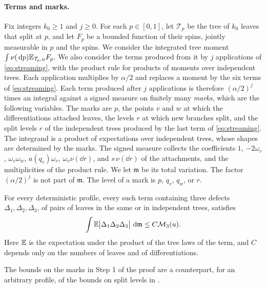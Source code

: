 \paragraph{Terms and marks.}
Fix integers $k_0\ge1$ and $j\ge0$. For each $p\in[0,1]$, let
$\mathcal T_p$ be the tree of $k_0$ leaves that split at $p$, and let
$F_p$ be a bounded function of their spins, jointly measurable in $p$ and
the spins. We consider the integrated tree moment
$\int\nu(\,\mathrm d p)\mathbb E_{\mathcal T_p,u}F_p$. We also consider the terms
produced from it by $j$ applications of \eqref{eq:streaming}, with the
product rule for products of moments over independent trees. Each
application multiplies by $\alpha/2$ and replaces a moment by the six
terms of \eqref{eq:streaming}. Each term produced after $j$ applications
is therefore $(\alpha/2)^j$ times an integral against a signed measure on
finitely many \emph{marks}, which are the following variables. The marks
are $p$, the points $v$ and $w$ at which the differentiations attached
leaves, the levels $r$ at which new branches split, and the split levels
$r$ of the independent trees produced by the last term of
\eqref{eq:streaming}. The integrand is a product of expectations over
independent trees, whose shapes are determined by the marks. The signed
measure collects the coefficients $1$, $-2\omega_v$, $\omega_v\omega_w$,
$a(q_v)\omega_v$, $\omega_v\nu(\dd r)$, and $s\,\nu(\dd r)$ of the
attachments, and the multiplicities of the product rule. We let
$\mathfrak m$ be its total variation. The factor $(\alpha/2)^j$ is not
part of $\mathfrak m$. The level of a mark is $p$, $q_v$, $q_w$, or $r$.

\begin{lemma}\label{lem:cav-threeproducts}
For every deterministic profile, every such term containing three
defects $\Delta_1,\Delta_2,\Delta_3$, of pairs of leaves in the same or
in independent trees, satisfies
\begin{equation}\label{eq:threeproducts}
 \int\mathbb E\bigl|\Delta_1\Delta_2\Delta_3\bigr|\,\,\mathrm d\mathfrak m
 \le C\mathcal M_3(u).
\end{equation}
Here $\mathbb E$ is the expectation under the product of the tree laws of the
term, and $C$ depends only on the numbers of leaves and of
differentiations.
\end{lemma}

The bounds on the marks in Step 1 of the proof are a counterpart, for an
arbitrary profile, of the bounds on split levels in
\cite[Lemma~2.8]{OpenAIFluctuationScale}.

